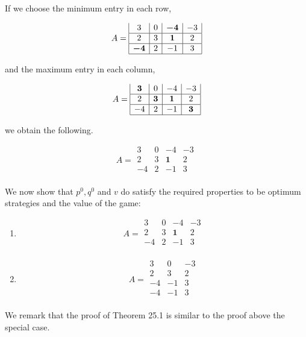 \documentclass[]{report}
\begin{document}

If we choose the minimum entry in each row,

\[
A = 
\begin{array}{|c|c|c|c|}
3 & 0 & \boldsymbol{-4} & -3 \\ \hline
2 & 3 & \boldsymbol{1} & 2 \\ \hline
\boldsymbol{-4} & 2 & -1 & 3 \\ \hline
\end{array}
\]



 and the maximum entry in each column, 

\[
A = 
\begin{array}{|c|c|c|c|}
\boldsymbol{3} & 0 & -4 & -3 \\ \hline
2 & \boldsymbol{3} & \boldsymbol{1} & 2 \\ \hline
-4 & 2 & -1 & \boldsymbol{3} \\ \hline
\end{array}
\]


we obtain the following.

\[
A = 
\begin{array}{cccc}
3 & 0 & -4 & -3 \\
2 & 3 & \boldsymbol{1} & 2 \\
-4 & 2 & -1 & 3 \\
\end{array}
\]

We now show that $p^0,q^0$ and $v$ do satisfy the required properties to be optimum strategies and the value of the game:
\begin{enumerate}
\item
\[
A = 
\begin{array}{cccc}
3 & 0 & -4 & -3 \\
2 & 3 & \boldsymbol{1} & 2 \\
-4 & 2 & -1 & 3 \\
\end{array}
\]
\item
\[
A = 
\begin{array}{ccc}
3 & 0  & -3 \\
2 & 3 & 2 \\
-4 &  -1 & 3 \\
-4 &  -1 & 3 \\
\end{array}
\]

\end{enumerate}
We remark that the proof of Theorem 25.1 is similar to the proof above the special case.
\end{document}
